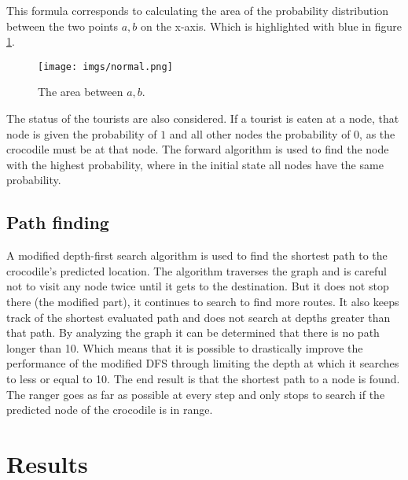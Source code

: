 \documentclass[12pt, a4paper]{article}
\newcommand{\HMM}[0]{%
  \mathtt{HMM}
}
\begin{document}
This formula corresponds to calculating the area of the probability distribution between the two points $a,b$ on the x-axis. Which is highlighted with blue in figure \ref{fig:normal.png}.

\begin{figure}[!ht]
\centering
\texttt{[image: imgs/normal.png]}\\
\caption{The area between $a,b$.}
\label{fig:normal.png}
\end{figure}

The status of the tourists are also considered. If a tourist is eaten at a node, that node is given the probability of $1$ and all other nodes the probability of $0$, as the crocodile must be at that node. The forward algorithm is used to find the node with the highest probability, where in the initial state all nodes have the same probability.

\subsection{Path finding}
A modified depth-first search algorithm\cite{dfsearch} is used to find the shortest path to the crocodile's predicted location. The algorithm traverses the graph and is careful not to visit any node twice until it gets to the destination. But it does not stop there (the modified part), it continues to search to find more routes. It also keeps track of the shortest evaluated path and does not search at depths greater than that path. By analyzing the graph it can be determined that there is no path longer than 10. Which means that it is possible to drastically improve the performance of the modified DFS through limiting the depth at which it searches to less or equal to 10. The end result is that the shortest path to a node is found. The ranger goes as far as possible at every step and only stops to search if the predicted node of the crocodile is in range.



\section{Results}
\end{document}
